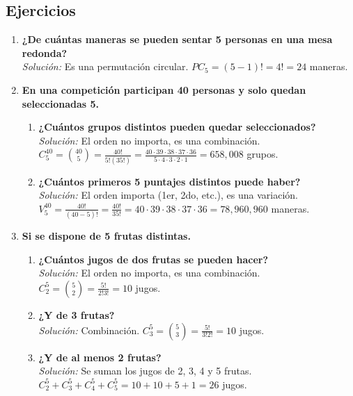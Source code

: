 \documentclass[12pt, letterpaper]{article}
\begin{document}
\subsection{Ejercicios}
\begin{enumerate}
	\item \textbf{¿De cuántas maneras se pueden sentar 5 personas en una mesa redonda?} \\
	      \textit{Solución:} Es una permutación circular. $PC_5 = (5-1)! = 4! = 24$ maneras.

	\item \textbf{En una competición participan 40 personas y solo quedan seleccionadas 5.}
	      \begin{enumerate}
		      \item \textbf{¿Cuántos grupos distintos pueden quedar seleccionados?} \\
		            \textit{Solución:} El orden no importa, es una combinación. \\
		            $C_5^{40} = \binom{40}{5} = \frac{40!}{5!(35!)} = \frac{40 \cdot 39 \cdot 38 \cdot 37 \cdot 36}{5 \cdot 4 \cdot 3 \cdot 2 \cdot 1} = 658,008$ grupos.
		      \item \textbf{¿Cuántos primeros 5 puntajes distintos puede haber?} \\
		            \textit{Solución:} El orden importa (1er, 2do, etc.), es una variación. \\
		            $V_5^{40} = \frac{40!}{(40-5)!} = \frac{40!}{35!} = 40 \cdot 39 \cdot 38 \cdot 37 \cdot 36 = 78,960,960$ maneras.
	      \end{enumerate}

	\item \textbf{Si se dispone de 5 frutas distintas.}
	      \begin{enumerate}
		      \item \textbf{¿Cuántos jugos de dos frutas se pueden hacer?} \\
		            \textit{Solución:} El orden no importa, es una combinación. \\
		            $C_2^5 = \binom{5}{2} = \frac{5!}{2!3!} = 10$ jugos.
		      \item \textbf{¿Y de 3 frutas?} \\
		            \textit{Solución:} Combinación. $C_3^5 = \binom{5}{3} = \frac{5!}{3!2!} = 10$ jugos.
		      \item \textbf{¿Y de al menos 2 frutas?} \\
		            \textit{Solución:} Se suman los jugos de 2, 3, 4 y 5 frutas. \\
		            $C_2^5 + C_3^5 + C_4^5 + C_5^5 = 10 + 10 + 5 + 1 = 26$ jugos.
	      \end{enumerate}
\end{enumerate}
\end{document}
